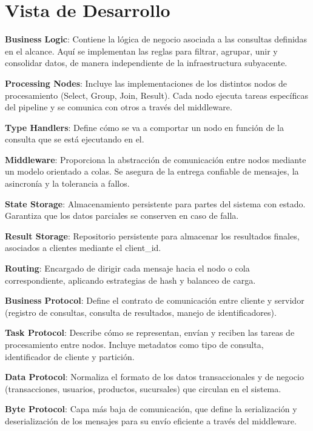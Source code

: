 \clearpage

\section{Vista de Desarrollo}

\textbf{Business Logic}: Contiene la lógica de negocio asociada a las consultas definidas en el alcance. Aquí se implementan las reglas para filtrar, agrupar, unir y consolidar datos, de manera independiente de la infraestructura subyacente.

\textbf{Processing Nodes}: Incluye las implementaciones de los distintos nodos de procesamiento (Select, Group, Join, Result). Cada nodo ejecuta tareas específicas del pipeline y se comunica con otros a través del middleware.

\textbf{Type Handlers}: Define cómo se va a comportar un nodo en función de la consulta que se está ejecutando en el.

\textbf{Middleware}: Proporciona la abstracción de comunicación entre nodos mediante un modelo orientado a colas. Se asegura de la entrega confiable de mensajes, la asincronía y la tolerancia a fallos.

\textbf{State Storage}: Almacenamiento persistente para partes del sistema con estado. Garantiza que los datos parciales se conserven en caso de falla.

\textbf{Result Storage}: Repositorio persistente para almacenar los resultados finales, asociados a clientes mediante el client\_id.

\textbf{Routing}: Encargado de dirigir cada mensaje hacia el nodo o cola correspondiente, aplicando estrategias de hash y balanceo de carga.

\textbf{Business Protocol}: Define el contrato de comunicación entre cliente y servidor (registro de consultas, consulta de resultados, manejo de identificadores).

\textbf{Task Protocol}: Describe cómo se representan, envían y reciben las tareas de procesamiento entre nodos. Incluye metadatos como tipo de consulta, identificador de cliente y partición.

\textbf{Data Protocol}: Normaliza el formato de los datos transaccionales y de negocio (transacciones, usuarios, productos, sucursales) que circulan en el sistema.

\textbf{Byte Protocol}: Capa más baja de comunicación, que define la serialización y deserialización de los mensajes para su envío eficiente a través del middleware.

